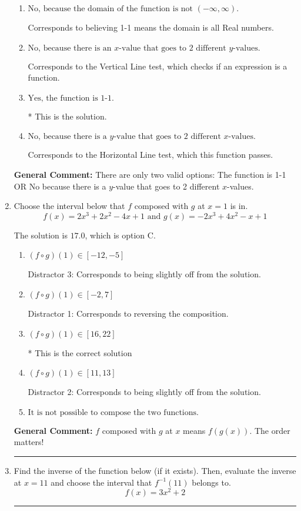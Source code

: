 \documentclass{extbook}[14pt]
\newcommand{\litem}[1]{\item #1

\rule{\textwidth}{0.4pt}}
\begin{document}
\begin{enumerate}
{\begin{enumerate}[label=\Alph*.]
Corresponds to believing 1-1 means the range is all Real numbers.
\item \( \text{No, because the domain of the function is not $(-\infty, \infty)$.} \)

Corresponds to believing 1-1 means the domain is all Real numbers.
\item \( \text{No, because there is an $x$-value that goes to 2 different $y$-values.} \)

Corresponds to the Vertical Line test, which checks if an expression is a function.
\item \( \text{Yes, the function is 1-1.} \)

* This is the solution.
\item \( \text{No, because there is a $y$-value that goes to 2 different $x$-values.} \)

Corresponds to the Horizontal Line test, which this function passes.
\end{enumerate}

\textbf{General Comment:} There are only two valid options: The function is 1-1 OR No because there is a $y$-value that goes to 2 different $x$-values.
}
\litem{
Choose the interval below that $f$ composed with $g$ at $x=1$ is in.
\[ f(x) = 2x^{3} +2 x^{2} -4 x + 1 \text{ and } g(x) = -2x^{3} +4 x^{2} -x + 1 \]

The solution is \( 17.0 \), which is option C.\begin{enumerate}[label=\Alph*.]
\item \( (f \circ g)(1) \in [-12, -5] \)

 Distractor 3: Corresponds to being slightly off from the solution.
\item \( (f \circ g)(1) \in [-2, 7] \)

 Distractor 1: Corresponds to reversing the composition.
\item \( (f \circ g)(1) \in [16, 22] \)

* This is the correct solution
\item \( (f \circ g)(1) \in [11, 13] \)

 Distractor 2: Corresponds to being slightly off from the solution.
\item \( \text{It is not possible to compose the two functions.} \)


\end{enumerate}

\textbf{General Comment:} $f$ composed with $g$ at $x$ means $f(g(x))$. The order matters!
}
\litem{
Find the inverse of the function below (if it exists). Then, evaluate the inverse at $x = 11$ and choose the interval that $f^{-1}(11)$ belongs to.
\[ f(x) = 3 x^2 + 2 \]

}
\end{enumerate}
\end{document}
